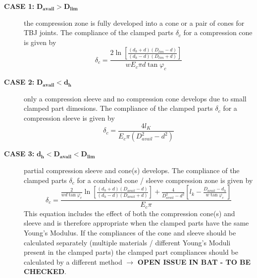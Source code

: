 \begin{description}
  \item[\textbf{CASE 1:} $\mathbf{D_{avail}>D_{lim}}$] the compression zone is fully developed into a cone or a pair 
    of cones for TBJ joints. The compliance of the clamped parts $\delta_c$ for a compression cone is given by 
    \begin{equation}
      \delta_c = \frac{2\ln\left[\frac{(d_h+d)(D_{lim}-d)}{(d_h-d)(D_{lim}+d)}\right]}
        {w E_c \pi d \tan \varphi_c}
      \label{equ:case_1}
    \end{equation}
  \item[\textbf{CASE 2:} $\mathbf{D_{avail}<d_h}$] only a compression sleeve and no compression cone
    develops due to small clamped part dimesions. The compliance of the clamped parts $\delta_c$ 
    for a compression sleeve is given by 
    \begin{equation}
      \delta_c = \frac{4 l_K}{E_c \pi \left( D_{avail}^2-d^2 \right)}
      \label{equ:case_2}
    \end{equation}
  \item[\textbf{CASE 3:} $\mathbf{d_h<D_{avail}<D_{lim}}$] partial compression sleeve and cone(s) develops.
    The compliance of the clamped parts $\delta_c$ for a combined cone / sleeve compression zone is given by 
    \begin{equation}
      \delta_c = \frac{\frac{2}{w d \tan \varphi_c}\ln\left[\frac{(d_h+d)(D_{avail}-d)}
        {(d_h-d)(D_{avail}+d)}\right] + \frac{4}{D_{avail}^2-d^2}\left[
          l_k - \frac{D_{avail}-d_h}{w \tan \varphi_c} \right]}{E_c \pi}
      \label{equ:case_3}
    \end{equation}
    This equation includes the effect of both the compression cone(s) and sleeve and is therefore 
    appropriate when the clamped parts have the same Young's Modulus. If the compliances of the cone and 
    sleeve should be calculated separately (multiple materials / different Young's Moduli present in the 
    clamped parts) the clamped part compliances should be calculated by a different method \cite{ECSS_HB_32_23A}
    $\rightarrow$ \textbf{OPEN ISSUE IN BAT - TO BE CHECKED}. 
\end{description}
